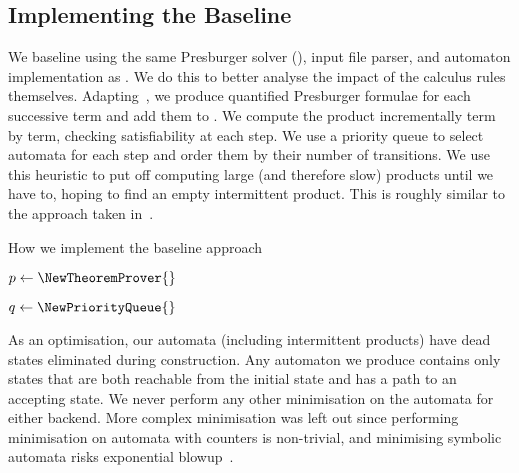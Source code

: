 \subsection{Implementing the Baseline}\label{sec:implementing-baseline}

We baseline using the same Presburger solver (\Princess{}), input file parser,
and automaton implementation as \Catra. We do this to better analyse the impact
of the calculus rules themselves. Adapting~\cite{generate-parikh-image}, we
produce quantified Presburger formulae for each successive term and add them to
\Princess. We compute the product incrementally term by term, checking
satisfiability at each step. We use a priority queue to select automata for each
step and order them by their number of transitions. We use this heuristic to put
off computing large (and therefore slow) products until we have to, hoping to
find an empty intermittent product. This is roughly similar to the approach
taken in~\cite{approximate-parikh}.

\begin{algorithm}
  \caption{How we implement the baseline approach}\label{alg:baseline}

  $p \gets \NewTheoremProver{}$



  $q \gets \NewPriorityQueue{}$


  

  \end{algorithm}

As an optimisation, our automata (including intermittent products) have dead
states eliminated during construction. Any automaton we produce contains only
states that are both reachable from the initial state and has a path to an
accepting state. We never perform any other minimisation on the automata for
either backend. More complex minimisation was left out since performing
minimisation on automata with counters is non-trivial, and minimising symbolic
automata risks exponential blowup~\cite{minimising-symbolic}.


